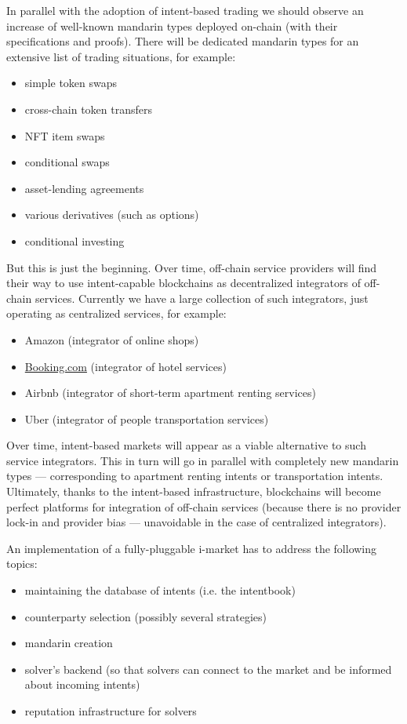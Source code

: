 \documentclass[a4paper]{article}
\begin{document}
In parallel with the adoption of intent-based trading we should observe an increase of well-known mandarin types deployed on-chain (with their specifications and proofs). There will be dedicated mandarin types for an extensive list of trading situations, for example:

\begin{itemize}
  \item simple token swaps
  \item cross-chain token transfers
  \item NFT item swaps
  \item conditional swaps
  \item asset-lending agreements
  \item various derivatives (such as options)
  \item conditional investing
\end{itemize}

But this is just the beginning. Over time, off-chain service providers will find their way to use intent-capable blockchains as decentralized integrators of off-chain services. Currently we have a large collection of such integrators, just operating as centralized services, for example:

\begin{itemize}
  \item Amazon (integrator of online shops)
  \item \href{http://Booking.com}{Booking.com} (integrator of hotel services)
  \item Airbnb (integrator of short-term apartment renting services)
  \item Uber (integrator of people transportation services)
\end{itemize}

Over time, intent-based markets will appear as a viable alternative to such service integrators. This in turn will go in parallel with completely new mandarin types --- corresponding to apartment renting intents or transportation intents. Ultimately, thanks to the intent-based infrastructure, blockchains will become perfect platforms for integration of off-chain services (because there is no provider lock-in and provider bias --- unavoidable in the case of centralized integrators).

An implementation of a fully-pluggable i-market has to address the following topics:

\begin{itemize}
  \item maintaining the database of intents (i.e. the intentbook)
  \item counterparty selection (possibly several strategies)
  \item mandarin creation
  \item solver's backend (so that solvers can connect to the market and be informed about incoming intents)
  \item reputation infrastructure for solvers
\end{itemize}
\end{document}
